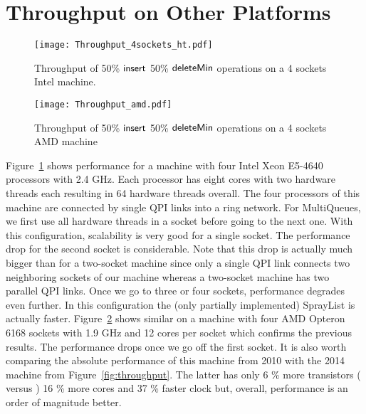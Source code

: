 \documentclass[a4paper,12pt]{article}
\newcommand{\Id}[1]{\ensuremath{\text{{\sf #1}}}}
\begin{document}


\clearpage
\appendix
\section{Throughput on Other Platforms}
\begin{figure}[h]
\centering\texttt{[image: Throughput\_4sockets\_ht.pdf]}
\caption{Throughput of 50\% \Id{insert} 50\% \Id{deleteMin} operations on a 4 sockets Intel machine.} 
\label{fig:socket4ht}
\end{figure}
\begin{figure}[h]
\centering\texttt{[image: Throughput\_amd.pdf]}
\caption{Throughput of 50\% \Id{insert} 50\% \Id{deleteMin} operations on a 4 sockets AMD machine} 
\label{fig:4socketAMD}
\end{figure}

Figure~\ref{fig:socket4ht} shows performance for a machine with 
four Intel Xeon E5-4640 processors with 2.4 GHz. Each processor has eight cores with two hardware threads each resulting in 64 hardware threads overall.
The four processors of this machine are connected by single QPI links into a ring network.
For MultiQueues, we first use all hardware threads in a socket before going to the next one. With this configuration, scalability is very good for a single socket. The performance drop for the second socket is considerable. Note that this drop is actually much bigger than for a two-socket machine since only a single QPI link connects two neighboring sockets of our machine whereas a two-socket machine has two parallel QPI links. Once we go to three or four sockets, performance degrades even further. In this configuration the (only partially implemented) SprayList is actually faster.
Figure~\ref{fig:4socketAMD} shows similar on a machine with four AMD Opteron 6168 sockets with 1.9 GHz and 12 cores per socket which confirms the previous results. The performance drops once we go off the first socket.
It is also worth comparing the absolute performance of this machine from 
2010 with the 2014 machine from Figure~\ref{fig:throughput}. The latter has only
6 \% more transistors ( versus ) 16 \% more cores and 37 \% faster clock but, overall, performance is an order of magnitude better. 
\end{document}

